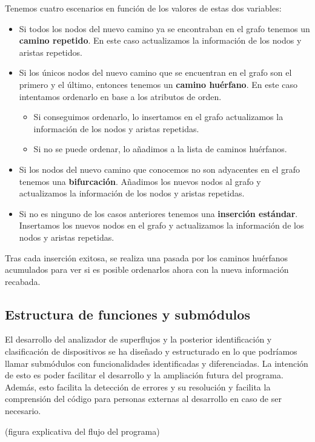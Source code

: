 \documentclass[twoside, 12pt]{epstfg}
\begin{document}
Tenemos cuatro escenarios en función de los valores de estas dos variables:
\begin{itemize}
    \item Si todos los nodos del nuevo camino ya se encontraban en el grafo tenemos un \textbf{camino repetido}. En este caso actualizamos la información de los nodos y aristas repetidos.
    \item Si los únicos nodos del nuevo camino que se encuentran en el grafo son el primero y el último, entonces tenemos un \textbf{camino huérfano}. En este caso intentamos ordenarlo en base a los atributos de orden.
    \begin{itemize}
        \item Si conseguimos ordenarlo, lo insertamos en el grafo actualizamos la información de los nodos y aristas repetidas.
        \item Si no se puede ordenar, lo añadimos a la lista de caminos huérfanos.
    \end{itemize}
    \item Si los nodos del nuevo camino que conocemos no son adyacentes en el grafo tenemos una \textbf{bifurcación}. Añadimos los nuevos nodos al grafo y actualizamos la información de los nodos y aristas repetidas.
    \item Si no es ninguno de los casos anteriores tenemos una \textbf{inserción estándar}. Insertamos los nuevos nodos en el grafo y actualizamos la información de los nodos y aristas repetidas.
\end{itemize}
Tras cada inserción exitosa, se realiza una pasada por los caminos huérfanos acumulados para ver si es posible ordenarlos ahora con la nueva información recabada.

\subsection{Estructura de funciones y submódulos}
\label{subsec:Desarrollo:Ordenacion:EstructuraFunciones}
El desarrollo del analizador de superflujos y la posterior identificación y clasificación de dispositivos se ha diseñado y estructurado en lo que podríamos llamar submódulos con funcionalidades identificadas y diferenciadas. La intención de esto es poder facilitar el desarrollo y la ampliación futura del programa. Además, esto facilita la detección de errores y su resolución y facilita la comprensión del código para personas externas al desarrollo en caso de ser necesario.

(figura explicativa del flujo del programa)
\end{document}

